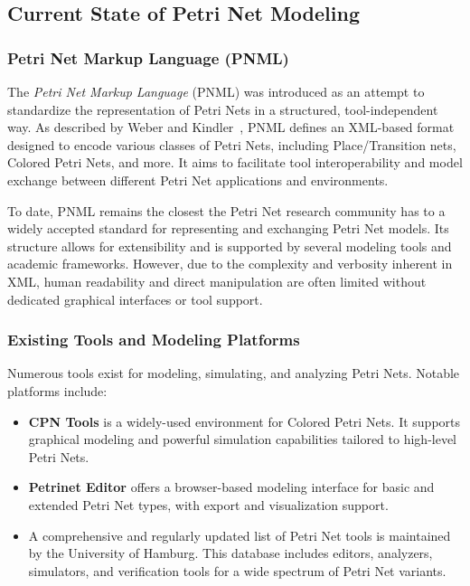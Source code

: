 \documentclass[12pt]{article}
\begin{document}
    \subsection{Current State of Petri Net Modeling}

        \subsubsection{Petri Net Markup Language (PNML)}

        The \textit{Petri Net Markup Language} (PNML) was introduced as an attempt to standardize the representation of Petri Nets in a structured, tool-independent way. As described by Weber and Kindler~\cite{weber2003petri}, PNML defines an XML-based format designed to encode various classes of Petri Nets, including Place/Transition nets, Colored Petri Nets, and more. It aims to facilitate tool interoperability and model exchange between different Petri Net applications and environments.

        To date, PNML remains the closest the Petri Net research community has to a widely accepted standard for representing and exchanging Petri Net models. Its structure allows for extensibility and is supported by several modeling tools and academic frameworks. However, due to the complexity and verbosity inherent in XML, human readability and direct manipulation are often limited without dedicated graphical interfaces or tool support.

        \subsubsection{Existing Tools and Modeling Platforms}

        Numerous tools exist for modeling, simulating, and analyzing Petri Nets. Notable platforms include:

        \begin{itemize}
            \item \textbf{CPN Tools}\cite{verbeek2021cpn} is a widely-used environment for Colored Petri Nets. It supports graphical modeling and powerful simulation capabilities tailored to high-level Petri Nets.
            \item \textbf{Petrinet Editor}\cite{app10217662} offers a browser-based modeling interface for basic and extended Petri Net types, with export and visualization support.
            \item A comprehensive and regularly updated list of Petri Net tools is maintained by the University of Hamburg\cite{tgi_petri_tools}. This database includes editors, analyzers, simulators, and verification tools for a wide spectrum of Petri Net variants.
        \end{itemize}
\end{document}
